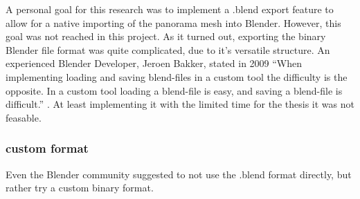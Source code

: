 A personal goal for this research was to implement a .blend export feature to allow for a native importing of the panorama mesh into Blender. However, this goal was not reached in this project. As it turned out, exporting the binary Blender file format was quite complicated, due to it's versatile structure. An experienced Blender Developer, Jeroen Bakker, stated in 2009 “When implementing loading and saving blend-files in a custom tool the difficulty is the opposite. In a custom tool loading a blend-file is easy, and saving a blend-file is difficult.” \parencite[see]{webMysteryOfTheBlend}. At least implementing it with the limited time for the thesis it was not feasable.



\subsubsection{custom format}

Even the Blender community suggested to not use the .blend format directly, but rather try a custom binary format. \parencite[compare]{webBlenderArtistsBlendExport}